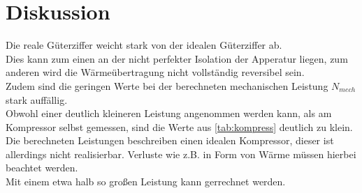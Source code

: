\section{Diskussion}
\label{sec:Diskussion}
Die reale Güterziffer weicht stark von der idealen Güterziffer ab.\\
Dies kann zum einen an der nicht perfekter Isolation der Apperatur liegen, 
zum anderen wird die Wärmeübertragung nicht vollständig 
reversibel sein.\newline\\
Zudem sind die geringen Werte bei der berechneten mechanischen Leistung $N_{mech}$
stark auffällig.\\ Obwohl einer deutlich kleineren Leistung angenommen werden kann, als
am Kompressor selbst gemessen, sind die Werte aus \ref{tab:kompress} deutlich zu klein.
Die berechneten Leistungen beschreiben einen idealen Kompressor, dieser ist allerdings nicht realisierbar.
Verluste wie z.\;B. in Form von Wärme müssen hierbei beachtet werden.\\
Mit einem etwa halb so großen Leistung kann gerrechnet werden.  